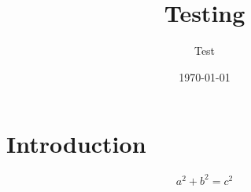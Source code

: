 \documentclass{article}
\title{Testing}
\author{Test}
\date{\today}
\begin{document}
\maketitle

\section{Introduction}
\label{sec:introduction}

$$a^{2} + b^{2} = c^{2}$$
\end{document}
